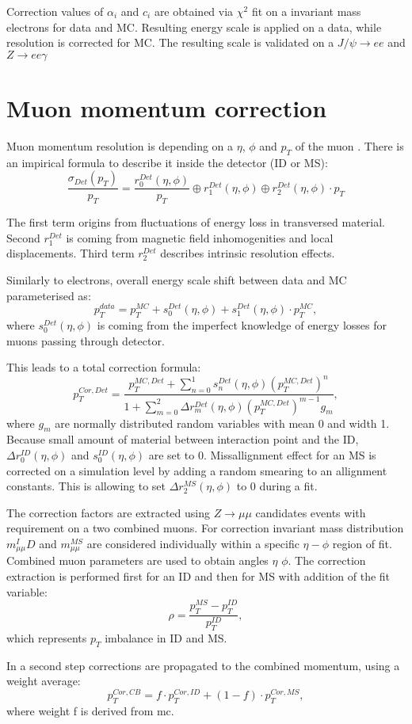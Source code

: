 Correction values of $\alpha_i$ and $c_i$ are obtained via $\chi^2$ fit on a invariant mass electrons for data and MC. Resulting energy scale is applied on a data, while resolution is corrected for MC. The resulting scale is validated on a $J/\psi \to ee$ and $Z\to ee \gamma$

\section{Muon momentum correction}
Muon momentum resolution is depending on a $\eta$, $\phi$ and $p_T$ of the muon \cite{AtlasExperiment}. There is an impirical formula to describe it inside the detector (ID or MS):
\begin{equation}\label{eq:MuonResolution}
\frac{\sigma_{Det}(p_T)}{p_T}=\frac{r^{Det}_0(\eta, \phi)}{p_T} \oplus r^{Det}_1 (\eta, \phi)  \oplus r^{Det}_2(\eta, \phi) \cdot p_T
\end{equation}

The first term origins from fluctuations of energy loss in transversed material. Second $r^{Det}_1$ is coming from magnetic field inhomogenities and local displacements. Third term $r^{Det}_2$ describes intrinsic resolution effects. 

Similarly to electrons, overall energy scale shift between data and MC parameterised as:
\begin{equation}
p_T^{data}=p_T^{MC}+s_0^{Det}(\eta, \phi)+s_1^{Det}(\eta, \phi) \cdot p_T^{MC},
\end{equation}
where $s_0^{Det}(\eta, \phi)$ is coming from the imperfect knowledge of energy losses for muons passing through detector. 

This leads to a total correction formula:
\begin{equation}
p^{Cor,Det}_T=\frac{p_{T}^{MC,Det}+\sum\limits_{n=0}^1 s_n^{Det}(\eta, \phi)(p_T^{MC,Det})^n}{1+\sum\limits_{m=0}^2 \Delta r_m^{Det}(\eta, \phi)(p_T^{MC,Det})^{m-1} g_m},
\end{equation}
where $g_m$ are normally distributed random variables with mean 0 and width 1. Because small amount of material between interaction point and the ID, $\Delta r^{ID}_0(\eta, \phi)$ and $s_0^{ID}(\eta, \phi)$ are set to 0. Missallignment effect for an MS is corrected on a simulation level by adding a random smearing to an allignment constants. This is allowing to set $\Delta r^{MS}_2(\eta, \phi)$ to 0 during a fit. 

The correction factors are extracted using $Z \to \mu \mu$ candidates events with requirement on a two combined muons. For correction invariant mass distribution $m_{\mu\mu}^ID$ and $m_{\mu\mu}^{MS}$ are considered individually within a specific $\eta - \phi$ region of fit. Combined muon parameters are used to obtain angles $\eta$ $\phi$. 
The correction extraction is performed first for an ID and then for MS with addition of the fit variable:
\begin{equation}
\rho = \frac{p_T^{MS}-p_T^{ID}}{p_T^{ID}},
\end{equation}
which represents $p_T$ imbalance in ID and MS. 

In a second step corrections are propagated to the combined momentum, using a weight average:
\begin{equation}
p_T^{Cor,CB}= f\cdot p_T^{Cor,ID}+(1-f) \cdot p_T^{Cor,MS},
\end{equation}
where weight f is derived from mc. 
